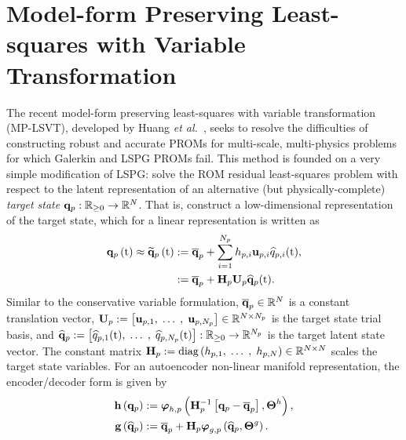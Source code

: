 \section{Model-form Preserving Least-squares with Variable Transformation}\label{sec:mplsvt}

The recent model-form preserving least-squares with variable transformation (MP-LSVT), developed by Huang \textit{et al.}~\cite{Huang2022}, seeks to resolve the difficulties of constructing robust and accurate PROMs for multi-scale, multi-physics problems for which Galerkin and LSPG PROMs fail. This method is founded on a very simple modification of LSPG: solve the ROM residual least-squares problem with respect to the latent representation of an alternative (but physically-complete) \textit{target state} $\mathbf{q}_{p}: \mathbb{R}_{\ge 0} \rightarrow \mathbb{R}^{N}$. That is, construct a low-dimensional representation of the target state, which for a linear representation is written as
%
\begin{equation}\label{eq:primSolApprox}
    \begin{aligned}
        \primFunc{\timeVar} \approx \primFuncRom{\timeVar} &\defEq \primVecCent + \sum_{\dummyIdx=1}^{\numPrimModes} \primScaleVar{\dummyIdx} \primTrialVecIdx \primVarCoefIdx (\timeVar), \\
        &\defEq \primAffineMap(\timeVar).
    \end{aligned}
\end{equation}
%
Similar to the conservative variable formulation, $\mathbf{\overline{q}}_{p} \in \mathbb{R}^{N}$ is a constant translation vector, $\primTrial \defEq \left[\primTrialVec{1}, \; \hdots \;, \; \primTrialVec{\numPrimModes}\right] \inRTwo{\numDOF}{\numPrimModes}$ is the target state trial basis, and $\mathbf{\widehat{q}}_{p} := \left[\widehat{q}_{p,1}(\text{t}), \; \hdots \;, \; \widehat{q}_{p,N_p}(\text{t})\right]: \mathbb{R}_{\ge 0} \rightarrow \mathbb{R}^{N_p}$ is the target latent state vector. The constant matrix $\primScale \defEq \text{diag}\left(\primScaleVar{1}, \; \hdots \; , \; \primScaleVar{\numDOF}\right) \inRTwo{\numDOF}{\numDOF}$ scales the target state variables. For an autoencoder non-linear manifold representation, the encoder/decoder form is given by
%
\begin{align}
    \encoderFunc{\primVec} &\defEq \nnLayer_{\encoderVar,\primVar} \left(\primScaleInv\left[\primVec - \primVecCent\right], \nnParams^{\encoderVar}\right), \\
    \decoderFunc{\primVecCoef} &\defEq \primVecCent + \primScale \trialPrimFunc{\primVecCoef, \nnParams^{\decoderVar}}. \label{eq:decoderFuncPrim}
\end{align}
